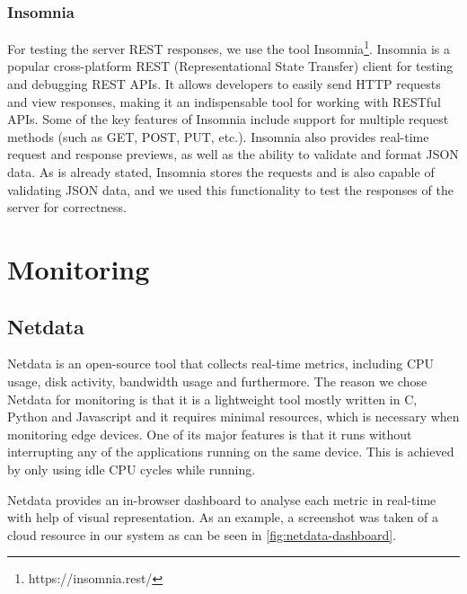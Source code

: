 \documentclass{article}
\begin{document}
            \subsubsection*{Insomnia}
            
                For testing the server REST responses, we use the tool Insomnia\footnote{https://insomnia.rest/}.
                Insomnia is a popular cross-platform REST (Representational State Transfer) client for testing and debugging REST APIs. It allows developers to easily send HTTP requests and view responses, making it an indispensable tool for working with RESTful APIs. Some of the key features of Insomnia include support for multiple request methods (such as GET, POST, PUT, etc.). Insomnia also provides real-time request and response previews, as well as the ability to validate and format JSON data.
                As is already stated, Insomnia stores the requests and is also capable of validating JSON data, and we used this functionality to test the responses of the server for correctness.

        


    \section{Monitoring}
            
        \subsection{Netdata}
        \label{sec:netdata}

            Netdata is an open-source tool that collects real-time metrics, including CPU usage, disk activity, bandwidth usage and furthermore.
            The reason we chose Netdata for monitoring is that it is a lightweight tool mostly written in C, Python and Javascript and it requires minimal resources, which is necessary when monitoring edge devices.
            One of its major features is that it runs without interrupting any of the applications running on the same device. This is achieved by only using idle CPU cycles while running.

            Netdata provides an in-browser dashboard to analyse each metric in real-time with help of visual representation. As an example, a screenshot was taken of a cloud resource in our system as can be seen in \ref{fig:netdata-dashboard}.
\end{document}
